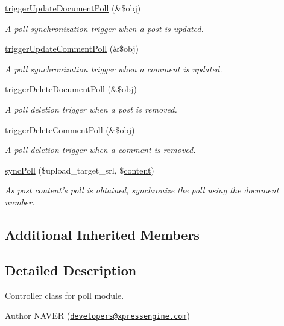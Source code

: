 \begin{DoxyCompactItemize}
\hyperlink{classpollController_a20c5267c985ebf4484a61b238850f0c5}{trigger\-Update\-Document\-Poll} (\&\$obj)
\begin{DoxyCompactList}\small\item\em A poll synchronization trigger when a post is updated. \end{DoxyCompactList}\item 
\hyperlink{classpollController_a2f3da10fbc7dc8bf7dddaf0e81e152ab}{trigger\-Update\-Comment\-Poll} (\&\$obj)
\begin{DoxyCompactList}\small\item\em A poll synchronization trigger when a comment is updated. \end{DoxyCompactList}\item 
\hyperlink{classpollController_ac74ea74fb486787ce4c6c3c9fe3a91da}{trigger\-Delete\-Document\-Poll} (\&\$obj)
\begin{DoxyCompactList}\small\item\em A poll deletion trigger when a post is removed. \end{DoxyCompactList}\item 
\hyperlink{classpollController_abd194582f292d00b57a524453ef256d3}{trigger\-Delete\-Comment\-Poll} (\&\$obj)
\begin{DoxyCompactList}\small\item\em A poll deletion trigger when a comment is removed. \end{DoxyCompactList}\item 
\hyperlink{classpollController_a9a22d9c1e70e7fdf3d635cc4e02fe8f7}{sync\-Poll} (\$upload\-\_\-target\-\_\-srl, \$\hyperlink{classcontent}{content})
\begin{DoxyCompactList}\small\item\em As post content's poll is obtained, synchronize the poll using the document number. \end{DoxyCompactList}\end{DoxyCompactItemize}
\subsection*{Additional Inherited Members}


\subsection{Detailed Description}
Controller class for poll module. 

\begin{DoxyAuthor}{Author}
N\-A\-V\-E\-R (\href{mailto:developers@xpressengine.com}{\tt developers@xpressengine.\-com}) 
\end{DoxyAuthor}


